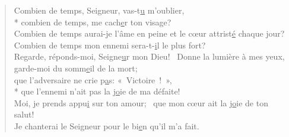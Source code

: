 
\begin{verse}
Combien de temps, Seigneur, vas-t\underline{u} m’oublier, \\*
combien de temps, me cach\underline{e}r ton visage? \\
Combien de temps aurai-je l’âme en peine
et le cœur attrist\underline{é} chaque jour?~\psalmstar
Combien de temps mon ennemi sera-t-\underline{i}l le plus fort? \\

Regarde, réponds-moi, Seigne\underline{u}r mon Dieu!~\psalmstar
Donne la lumière à mes yeux, \\
garde-moi du somm\underline{e}il de la mort; \\
que l’adversaire ne crie p\underline{a}s: « Victoire ! », \\*
que l’ennemi n’ait pas la j\underline{o}ie de ma défaite! \\

Moi, je prends appu\underline{i} sur ton amour;~\psalmdagger
que mon cœur ait la j\underline{o}ie de ton salut! \\
Je chanterai le Seigneur pour le bi\underline{e}n qu’il m’a fait. \\
\end{verse}

